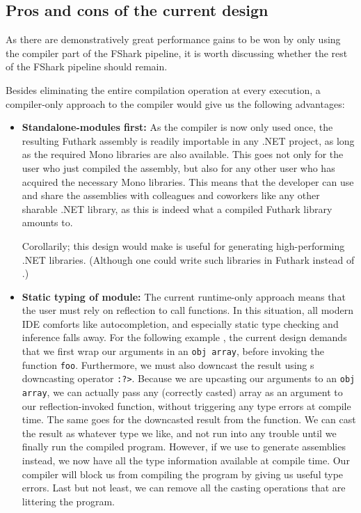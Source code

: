 
\subsection{Pros and cons of the current design}
As there are demonstratively great performance gains to be won by only using the
compiler part of the FShark pipeline, it is worth discussing whether the
rest of the FShark pipeline should remain.

Besides eliminating the entire compilation operation at every \fshark{}
execution, a compiler-only approach to the \fshark{} compiler would give us the
following advantages:
\begin{itemize}
\item \textbf{Standalone-modules first:} As the compiler is now only
  used once, the resulting Futhark assembly is readily importable in any .NET
  project, as long as the required Mono libraries are also available.
  This goes not only for the user who just compiled the assembly, but also for
  any other user who has acquired the necessary Mono libraries. This means that
  the \fshark{} developer can use and share the \fshark{} assemblies with
  colleagues and coworkers like any other sharable .NET library,
  as this is indeed what a compiled Futhark
  \csharp{} library amounts to.

  Corollarily; this \fshark{} design would make \fshark{} is useful for generating
  high-performing .NET libraries. (Although one could write such libraries in
  Futhark instead of \fshark{}.)

\item \textbf{Static typing of \fshark{} module:} The current runtime-only
  approach means that the user must rely on reflection to call \fshark{}
  functions.
  In this situation, all modern IDE comforts like autocompletion, and especially
  static type checking and inference falls away.
  For the following example
  , the current design demands that we first wrap our arguments in an
  \texttt{obj array}, before invoking the function \texttt{foo}. Furthermore, we
  must also downcast the result using \fsharp{}s downcasting operator \texttt{:?>}.
  Because we are upcasting our arguments to an \texttt{obj array}, we can
  actually pass any (correctly casted) array as an argument to our
  reflection-invoked function, without triggering any type errors at compile
  time.
  The same goes for the downcasted result from the function. We can cast the
  result as whatever type we like, and not run into any trouble until we finally
  run the compiled program.
  However, if we use \fshark{} to generate assemblies instead, we now have all
  the type information available at compile time. Our compiler will block us
  from compiling the program by giving us useful type errors. Last but not
  least, we can remove all the casting operations that are littering the
  program.
  

\end{itemize}

